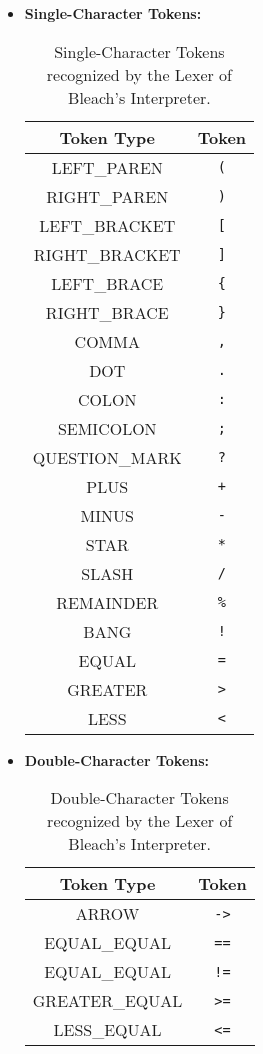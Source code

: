 \begin{itemize}
    \item \textbf{Single-Character Tokens:}
    \begin{table}[h]
    \centering
        \begin{tabular}{|c|c|}
        \hline
        Token Type & Token \\ \hline
        LEFT\_PAREN & \texttt{(} \\ \hline
        RIGHT\_PAREN & \texttt{)} \\ \hline
        LEFT\_BRACKET & \texttt{[} \\ \hline
        RIGHT\_BRACKET & \texttt{]} \\ \hline
        LEFT\_BRACE & \texttt{\{} \\ \hline
        RIGHT\_BRACE & \texttt{\}} \\ \hline
        COMMA & \texttt{,} \\ \hline
        DOT & \texttt{.} \\ \hline
        COLON & \texttt{:} \\ \hline
        SEMICOLON & \texttt{;} \\ \hline
        QUESTION\_MARK & \texttt{?} \\ \hline
        PLUS & \texttt{+} \\ \hline
        MINUS & \texttt{-} \\ \hline
        STAR & \texttt{*} \\ \hline
        SLASH & \texttt{/} \\ \hline
        REMAINDER & \texttt{\%} \\ \hline
        BANG & \texttt{!} \\ \hline
        EQUAL & \texttt{=} \\ \hline
        GREATER & \texttt{>} \\ \hline
        LESS & \texttt{<} \\ \hline
        \end{tabular}
        \caption{Single-Character Tokens recognized by the Lexer of Bleach's Interpreter. \newline \newline \newline}
    \end{table}

    \item \textbf{Double-Character Tokens:}
    \begin{table}[H]
    \centering
        \begin{tabular}{|c|c|}
        \hline
        Token Type & Token \\ \hline
        ARROW & \texttt{->} \\ \hline
        EQUAL\_EQUAL & \texttt{==} \\ \hline
        EQUAL\_EQUAL & \texttt{!=} \\ \hline
        GREATER\_EQUAL & \texttt{>=} \\ \hline
        LESS\_EQUAL & \texttt{<=} \\ \hline        
        \end{tabular}
        \caption{Double-Character Tokens recognized by the Lexer of Bleach's Interpreter.}
    \end{table}


\end{itemize}
